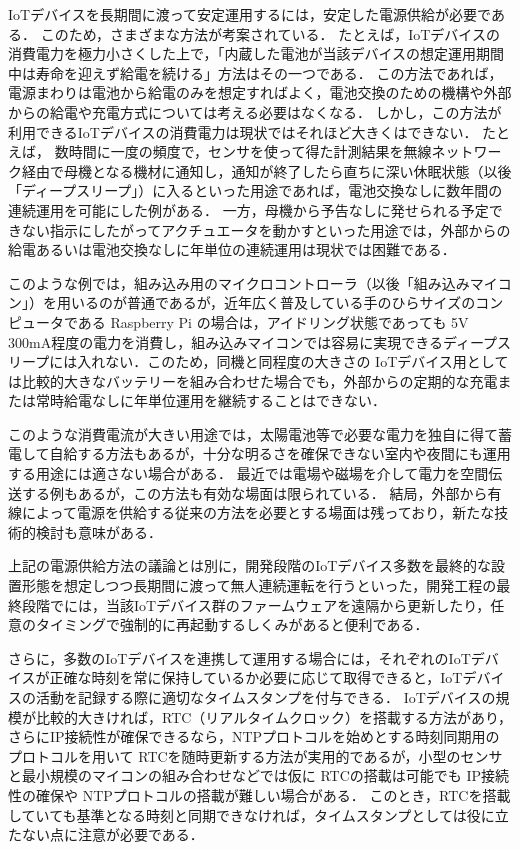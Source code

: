 IoTデバイスを長期間に渡って安定運用するには，安定した電源供給が必要である．
このため，さまざまな方法が考案されている．
たとえば，IoTデバイスの消費電力を極力小さくした上で，「内蔵した電池が当該デバイスの想定運用期間中は寿命を迎えず給電を続ける」方法はその一つである．
この方法であれば，電源まわりは電池から給電のみを想定すればよく，電池交換のための機構や外部からの給電や充電方式については考える必要はなくなる．
しかし，この方法が利用できるIoTデバイスの消費電力は現状ではそれほど大きくはできない．
たとえば，
数時間に一度の頻度で，センサを使って得た計測結果を無線ネットワーク経由で母機となる機材に通知し，通知が終了したら直ちに深い休眠状態（以後「ディープスリープ」）に入るといった用途であれば，電池交換なしに数年間の連続運用を可能にした例がある．
一方，母機から予告なしに発せられる予定できない指示にしたがってアクチュエータを動かすといった用途では，外部からの給電あるいは電池交換なしに年単位の連続運用は現状では困難である．

このような例では，組み込み用のマイクロコントローラ（以後「組み込みマイコン」）を用いるのが普通であるが，近年広く普及している手のひらサイズのコンピュータである Raspberry Pi\cite{data:RaspberryPi} の場合は，アイドリング状態であっても 5V 300mA程度の電力を消費し，組み込みマイコンでは容易に実現できるディープスリープには入れない．このため，同機と同程度の大きさの IoTデバイス用としては比較的大きなバッテリーを組み合わせた場合でも，外部からの定期的な充電または常時給電なしに年単位運用を継続することはできない．

このような消費電流が大きい用途では，太陽電池等で必要な電力を独自に得て蓄電して自給する方法もあるが，十分な明るさを確保できない室内や夜間にも運用する用途には適さない場合がある．
最近では電場や磁場を介して電力を空間伝送する例もあるが，この方法も有効な場面は限られている．
結局，外部から有線によって電源を供給する従来の方法を必要とする場面は残っており，新たな技術的検討も意味がある．

上記の電源供給方法の議論とは別に，開発段階のIoTデバイス多数を最終的な設置形態を想定しつつ長期間に渡って無人連続運転を行うといった，開発工程の最終段階でには，当該IoTデバイス群のファームウェアを遠隔から更新したり，任意のタイミングで強制的に再起動するしくみがあると便利である．

さらに，多数のIoTデバイスを連携して運用する場合には，それぞれのIoTデバイスが正確な時刻を常に保持しているか必要に応じて取得できると，IoTデバイスの活動を記録する際に適切なタイムスタンプを付与できる．
IoTデバイスの規模が比較的大きければ，RTC（リアルタイムクロック）を搭載する方法があり，さらにIP接続性が確保できるなら，NTPプロトコルを始めとする時刻同期用のプロトコルを用いて
RTCを随時更新する方法が実用的であるが，小型のセンサと最小規模のマイコンの組み合わせなどでは仮に RTCの搭載は可能でも IP接続性の確保や NTPプロトコルの搭載が難しい場合がある．
このとき，RTCを搭載していても基準となる時刻と同期できなければ，タイムスタンプとしては役に立たない点に注意が必要である．


